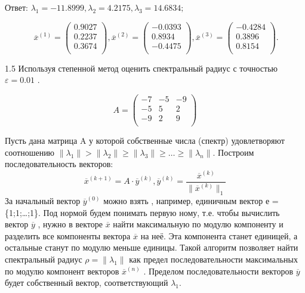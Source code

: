 \documentclass[10pt, a4paper]{scrartcl}
\begin{document}
Ответ:
\(\displaystyle \lambda_1 = -11.8999, \lambda_2 = 4.2175, \lambda_3 = 14.6834;\)

\[\: \overline{x}^{(1)} = \begin{pmatrix} 
0.9027\\
0.2237\\
0.3674\\
\end{pmatrix}, \overline{x}^{(2)} = \begin{pmatrix} 
-0.0393\\
0.8934\\
-0.4475\\
\end{pmatrix}, \overline{x}^{(3)} = \begin{pmatrix} 
-0.4284\\
0.3896\\
0.8154\\
\end{pmatrix}.\]

\pagebreak

1.5 Используя степенной метод оценить спектральный радиус с точностью
\(\varepsilon = 0.01\) .

\[A = \begin{pmatrix} 
-7 & -5 & -9\\
-5 & 5 & 2\\
-9 & 2 & 9\\
\end{pmatrix}\]

Пусть дана матрица A у которой собственные числа (спектр) удовлетворяют
соотношению
\(\|\lambda_1\| > \|\lambda_2\| \geq \|\lambda_3\| \geq \dots \geq \|\lambda_n\|\).
Построим последовательность векторов:
\[\overline{x}^{(k+1)} = A \cdot \overline{y}^{(k)} , \overline{y}^{(k)}=\frac{\overline{x}^{(k)}}{\parallel \overline{x}^{(k)} \parallel _1}\]
За начальный вектор \(\overline{y}^{(0)}\) можно взять , например,
единичным вектор е = \{1;1;\ldots{};1\}. Под нормой будем понимать
первую ному, т.е. чтобы вычислить вектор \(\overline{y}\) , нужно в
векторе \(\overline{x}\) найти максимальную по модулю компоненту и
разделить все компоненты вектора \(\overline{x}\) на неё. Эта компонента
станет единицей, а остальные станут по модулю меньше единицы. Такой
алгоритм позволяет найти спектральный радиус \(\rho=\| \lambda_1 \|\)
как предел последовательности максимальных по модулю компонент векторов
\(\overline{x}^{(n)}\) . Пределом последовательности векторов
\(\overline{y}\) будет собственный вектор, соответствующий
\(\lambda_1\).
\end{document}
